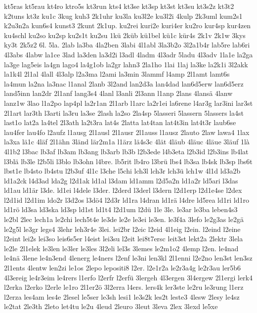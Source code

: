{kt5ras
kt5rau
kt4ro
ktro5s
kt3run
kts4
kt3se
kt3sp
kt3st
kt3su
kt3s2z
kt3t2
k2tuns
kt3z
ku1c
3kug
kuh3
2k1uhr
ku3la
ku3l2e
ku3l2i
4kulp
2k3uml
kum2s1
k2u3n2a
kun6s4
kunst3
2kunt
2k1up.
ku2rei
kuri2e
kuri4er
ku2ro
kur4sp
kur4zen
ku4schl
ku2so
ku2sp
ku2s1t
ku2su
1kü
2küb
kü1bel
kü1c
kür4s
2k1v
2k1w
3kys
ky3t
2k5z2
6l.
5la.
2lab
la3ba
4la2ben
3labi
4l1abl
3la3b2o
3l2a1b4r
lab5re
lab6ri
4l3abs
4labw
la1ce
3lad
la3den
la3d2i
l3adl
4ladm
4l3adr
5ladu
4l3adv
1la1e
la2ga
la3ge
lag5eis
la4gn
lago4
la4g1ob
la2gr
lahn3
2la1ho
1lai
1laj
la3ke
la2k1i
3l2akk
la1k4l
2l1al
4lall
4l3alp
l2a3ma
l2ami
la3min
3lammf
l4amp
2l1amt
lamt6s
la4mun
la2na
la3nac
l1anal
2lanb
3l2and
lan2d3a
lan4dad
lan6d5erw
lan6d5erz
land5inn
lan2dr
2l1anf
lang3s4
4lanl
l3anli
2l3ann
l1anp
2lans
4lansä
4lanw
lanz1w
3lao
l1a2po
lap4pl
la2r1an
2l1arb
l1arc
la2r1ei
la6rene
l4ar3g
lar3ini
lar3st
2l1art
lar3th
l3arti
la3ru
la3se
2lash
la2so
2la4sp
5lasseri
5lassern
5lassers
la4st
last1o
lat2a
la4tel
2l3ath
la2t3ra
lat4s
2latta
lat4tan
lat4t3in
lat4t3r
laub6se
lau4fer
lau4fo
l2aufz
l1ausg
2l1ausl
2l1ausr
2l1auss
l1ausz
2lauto
2law
lawa4
1lax
la3xa
lä1c
4läf
2l1ähn
3länd
lär2m1a
l1ärz
lä4s3c
4lät
4läub
4läuc
4läue
3läuf
1là
4l1b2
l3bac
lb3af
lb3am
lb3ang
lb3arb
lb3b
l2b3ede
l4b3eta
l2b3id
l2b3ins
lb4lat
l3blä
lb3le
l2b5li
l3blo
lb3ohn
l4bre.
lb5rit
lb4ro
l3brü
lbs4
lb3sa
lb4sk
lb3sp
lbs6t
lbst1e
lb4sto
lb4stu
l2b3uf
4l1c
l3che
l5chi
lch3l
lch3r
lch3ü
lch1w
4l1d
ld3a2b
ld1a2ck
l4d3ad
lda2g
l2d1ak
ld1al
l3dam
ld1amm
l2d5a2n
ld1a2r
ld5ari
l3das
ld1au
ld1är
l3de.
ld1ei
l4dele
l3der.
l2derd
l3derl
l3dern
l2d1erp
l2d1e4se
l2dex
l2d1id
l2d1im
ldo2r
l3d2os
l3dö4
l2d3r
ld1ra
l4dran
ld1rä
l4dre
ld5rea
ld1ri
ld1ro
ld1rö
ld3sa
ld3ska
ld3sp
ld1st
ld1t4
l2d1um
l2dü
1le
3le.
le3ar
le3ba
leben4s3
le2bl
2lec
lech1a
le2chi
lech5t4e
le3de
le2e
le3ei
le3en.
le3f4a
3lefo
le2g3as
le2gä
le2g5l
le3gr
legs4
3lehr
leh3r4e
3lei.
lei2br
l2eic
l2eid
4l1eig
l2ein.
l2eind
l2eine
l2eint
lei2s
lei3so
leis6s5er
l4eist
lei3su
l2eit
lei8t7ersc
leit3st
lekt2a
2lektr
3lela
le2le
2l1elek
le3len
le3ler
le3les
3l2eli
lel3s
3lemes
le2m1o2
4lemp
l2en.
le4nad
le4nä
3lene
le4n3end
4lenerg
le4ners
l2enf
le3ni
len3kl
2l1enni
l2e2no
len3st
len3sz
2l1ents
4lentw
len2zi
le1os
2lepo
lepositi8
l2er.
l2e1r2a
le2r3a4g
le2r3au
ler5b6
4l3ereig
le4r3eim
le4rers
l1erfo
l2erfr
l2erfü
3lergeh
4l3ergen
3l4ergew
2l1ergi
lerk4
l2erka
l2erko
l2erle
le1ro
2l1er2ö
3l2erra
l4ers.
lers4k
ler3ste
le2ru
le3rung
l1erz
l2erza
les4am
les4e
2lesel
le5ser
le3sh
lesi1
le3s2k
les2t
leste3
4lesw
2lesy
le4sz
le2tat
2le3th
2leto
let4tu
le2u
4leud
2leuro
3leut
3leva
2lex
3lexd
le5xe
}
